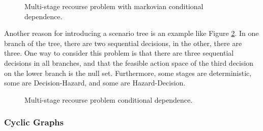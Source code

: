 \documentclass[final,1p,times]{elsarticle}
\newcommand{\drawHDsquiggle}[1]{\draw[-stealth, decoration={snake, amplitude = .4mm, segment length = 1.5mm, post length=0.9mm},decorate] (#1)+(-0.75, 0.5) -- (#1);}
\newcommand{\drawDHsquiggle}[1]{\draw[-stealth, decoration={snake, amplitude = .4mm, segment length = 1.5mm, post length=0.9mm},decorate] (#1)+(0.75, 0.5) -- (#1);}
\begin{document}
\begin{figure}[!ht]
    \centering
{}
\caption{Multi-stage recourse problem with markovian conditional dependence.}
\label{fig:markovian}
\end{figure}

Another reason for introducing a scenario tree is an example like Figure \ref{fig:multi}. In one branch of the tree, there are two sequential decisions, in the other, there are three. One way to consider this problem is that there are three sequential decisions in all branches, and that the feasible action space of the third decision on the lower branch is the null set. Furthermore, some stages are deterministic, some are Decision-Hazard, and some are Hazard-Decision.

\begin{figure}[!ht]
    \centering
{}
\caption{Multi-stage recourse problem conditional dependence.}
\label{fig:multi}
\end{figure}

\subsubsection{Cyclic Graphs}
\end{document}
